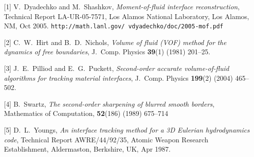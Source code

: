 \documentclass{report}
\begin{document}
[1] V.~Dyadechko and M.~Shashkov, {\em
Moment-of-fluid interface reconstruction},
Technical Report LA-UR-05-7571, Los Alamos
National Laboratory, Los Alamos, NM, Oct 2005.
{\tt http://math.lanl.gov/~vdyadechko/doc/2005-mof.pdf}

[2] C.~W.~Hirt and B.~D.~Nichols, {\em Volume of
fluid (VOF) method for the dynamics of free boundaries},
J.~Comp. Physics {\bf 39}(1) (1981) 201--25.

[3] J.~E.~Pilliod and E.~G.~Puckett, {\em Second-order
accurate volume-of-fluid algorithms for tracking
material interfaces}, J.~Comp. Physics {\bf 199}(2)
(2004) 465--502.

[4] B.~Swartz, {\em The second-order sharpening
of blurred smooth borders}, Mathematics of Computation,
{\bf 52}(186) (1989) 675--714

[5] D.~L.~Youngs, {\em An interface tracking method for a
3D Eulerian hydrodynamics code}, Technical Report
AWRE/44/92/35, Atomic Weapon Research Establishment,
Aldermaston, Berkshire, UK, Apr 1987.


\end{document}

